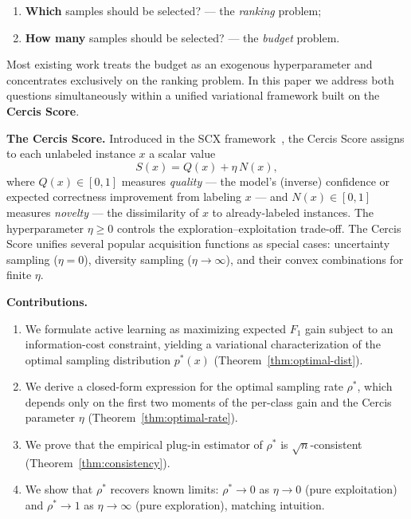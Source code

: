 \documentclass[12pt,a4paper]{article}
\begin{document}
\begin{enumerate}[label=(\roman*)]
    \item \textbf{Which} samples should be selected? — the \emph{ranking}
          problem;
    \item \textbf{How many} samples should be selected? — the \emph{budget}
          problem.
\end{enumerate}

Most existing work treats the budget as an exogenous hyperparameter and
concentrates exclusively on the ranking problem.  In this paper we address
both questions simultaneously within a unified variational framework built on
the \textbf{Cercis Score}.

\medskip\noindent
\textbf{The Cercis Score.}
Introduced in the SCX framework~\citep{scx2024cercis}, the Cercis Score
assigns to each unlabeled instance $x$ a scalar value
\begin{equation}\label{eq:cercis-def}
    S(x) = Q(x) + \eta\,N(x),
\end{equation}
where $Q(x)\in[0,1]$ measures \emph{quality} — the model's (inverse)
confidence or expected correctness improvement from labeling $x$ — and
$N(x)\in[0,1]$ measures \emph{novelty} — the dissimilarity of $x$ to
already-labeled instances.  The hyperparameter $\eta\geq0$ controls the
exploration--exploitation trade-off.  The Cercis Score unifies several
popular acquisition functions as special cases: uncertainty sampling
($\eta=0$), diversity sampling ($\eta\to\infty$), and their convex
combinations for finite $\eta$.

\medskip\noindent
\textbf{Contributions.}
\begin{enumerate}[label=(\arabic*)]
    \item We formulate active learning as maximizing expected $F_1$ gain
          subject to an information-cost constraint, yielding a variational
          characterization of the optimal sampling distribution $p^*(x)$
          (Theorem~\ref{thm:optimal-dist}).
    \item We derive a closed-form expression for the optimal sampling rate
          $\rho^*$, which depends only on the first two moments of the
          per-class gain and the Cercis parameter $\eta$
          (Theorem~\ref{thm:optimal-rate}).
    \item We prove that the empirical plug-in estimator of $\rho^*$ is
          $\sqrt{n}$-consistent (Theorem~\ref{thm:consistency}).
    \item We show that $\rho^*$ recovers known limits: $\rho^*\to0$ as
          $\eta\to0$ (pure exploitation) and $\rho^*\to1$ as
          $\eta\to\infty$ (pure exploration), matching intuition.
\end{enumerate}
\end{document}
